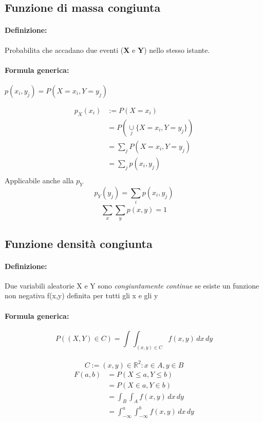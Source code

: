 \documentclass[]{article}
\newcommand{\definizione}{\paragraph{Definizione:}}
\newcommand{\formula}{\paragraph{Formula generica:}}
\begin{document}
    \subsection{Funzione di massa congiunta}
    \definizione Probabilita che accadano due eventi (\textbf{X} e \textbf{Y}) nello stesso istante.
    \formula $ p(x_i, y_j) = P(X=x_i, Y=y_j) $

    \begin{equation*}
        \begin{split}
            p_X(x_i) & := P(X = x_i) \\ 
            & = P(\underset{j}{\cup} \{ X=x_i, Y=y_j \}) \\
            & = \sum_{j}^{} P(X=x_i, Y=y_j) \\ 
            & = \sum_{j}^{} p(x_i, y_j) \\
        \end{split}
    \end{equation*}
    Applicabile anche alla $p_Y$
    \[ p_Y(y_j) = \sum_{i}^{} p(x_i, y_j) \]
    \linebreak[4]
    \[ \sum_{x}^{} \sum_{y}^{} p(x, y) = 1 \]

    \newpage
    \subsection{Funzione densità congiunta}
    \definizione Due variabili aleatorie X e Y sono \textit{congiuntamente continue} se esiste un funzione non negativa f(x,y)
    definita per tutti gli x e gli y
    \formula
    \[ P((X,Y) \in C) = \int_{}^{} \int_{(x,y) \in C}^{} f(x,y) \, dx \, dy \] \\

    \[ C:= {(x,y) \in \mathbb{R}^2 : x \in A, y \in B}\]
    \begin{equation*}
        \begin{split}
            F(a,b) & = P(X \leq a, Y \leq b) \\
            & = P(X \in a, Y \in b) \\
            & = \int_{B}^{} \int_{A}^{} f(x,y) \, dx \, dy \\
            & = \int_{-\infty}^{a} \int_{-\infty}^{b} f(x,y) \, dx \, dy \\
        \end{split}
    \end{equation*}
\end{document}
